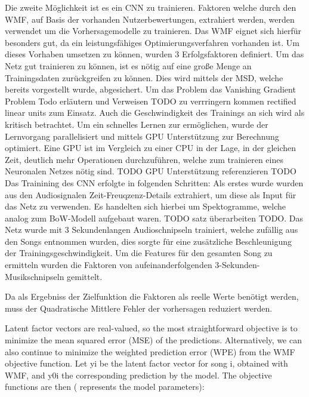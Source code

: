 \documentclass[twosided,a4,10pt]{article}
\begin{document}
\begin{multicols}{2}
		
		Die zweite Möglichkeit ist es ein CNN zu trainieren. Faktoren welche durch den WMF, auf Basis der vorhanden Nutzerbewertungen, extrahiert werden, werden verwendet um die Vorhersagemodelle zu trainieren. Das WMF eignet sich hierfür besonders gut, da ein leistungsfähiges Optimierungsverfahren vorhanden ist. Um dieses Vorhaben umsetzen zu können, wurden 3 Erfolgsfaktoren definiert. Um das Netz gut trainieren zu können, ist es nötig auf eine große Menge an Trainingsdaten zurückgreifen zu können. Dies wird mittels der MSD, welche bereits vorgestellt wurde, abgesichert. Um das Problem das Vanishing Gradient Problem Todo erläutern und Verweisen TODO zu verrringern kommen rectified linear units zum Einsatz. Auch die Geschwindigkeit des Trainings an sich wird als kritisch betrachtet. Um ein schnelles Lernen zur ermöglichen, wurde der Lernvorgang parallelisiert und mittels GPU Unterstützung zur Berechnung optimiert. Eine GPU ist im Vergleich zu einer CPU in der Lage, in der gleichen Zeit, deutlich mehr Operationen durchzuführen, welche zum trainieren eines Neuronalen Netzes nötig sind. TODO GPU Unterstützung referenzieren TODO
		Das Trainining des CNN erfolgte in folgenden Schritten: Als erstes wurde wurden aus den Audiosignalen Zeit-Freuqzenz-Details extrahiert, um diese als Input für das Netz zu verwenden. Es handelten sich hierbei um Spektogramme, welche analog zum BoW-Modell aufgebaut waren. TODO satz überarbeiten TODO. Das Netz wurde mit 3 Sekundenlangen Audioschnipseln trainiert, welche zufällig aus den Songs entnommen wurden, dies sorgte für eine zusätzliche Beschleunigung der Trainingsgeschwindigkeit. Um die Features für den gesamten Song zu ermitteln wurden die Faktoren von aufeinanderfolgenden 3-Sekunden-Musikschnipseln gemittelt. 
		
		Da als Ergebniss der Zielfunktion die Faktoren als reelle Werte benötigt werden, muss der Quadratische Mittlere Fehler der vorhersagen reduziert werden.
		
		Latent factor vectors are real-valued, so the most straightforward objective is to minimize the
		mean squared error (MSE) of the predictions. Alternatively, we can also continue to minimize
		the weighted prediction error (WPE) from the WMF objective function. Let yi be the latent factor
		vector for song i, obtained with WMF, and y0i
		the corresponding prediction by the model. The
		objective functions are then ( represents the model parameters):
		
		

\end{multicols}
\end{document}
